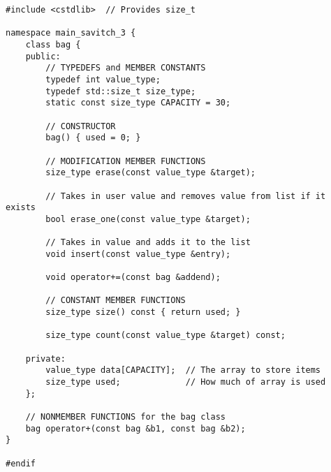 \documentclass[11pt]{article}
\begin{document}
\begin{lstlisting}
#include <cstdlib>  // Provides size_t

namespace main_savitch_3 {
    class bag {
    public:
        // TYPEDEFS and MEMBER CONSTANTS
        typedef int value_type;
        typedef std::size_t size_type;
        static const size_type CAPACITY = 30;

        // CONSTRUCTOR
        bag() { used = 0; }

        // MODIFICATION MEMBER FUNCTIONS
        size_type erase(const value_type &target);

        // Takes in user value and removes value from list if it exists
        bool erase_one(const value_type &target);

        // Takes in value and adds it to the list
        void insert(const value_type &entry);

        void operator+=(const bag &addend);

        // CONSTANT MEMBER FUNCTIONS
        size_type size() const { return used; }

        size_type count(const value_type &target) const;

    private:
        value_type data[CAPACITY];  // The array to store items
        size_type used;             // How much of array is used
    };

    // NONMEMBER FUNCTIONS for the bag class
    bag operator+(const bag &b1, const bag &b2);
}

#endif
\end{lstlisting}
\end{document}
